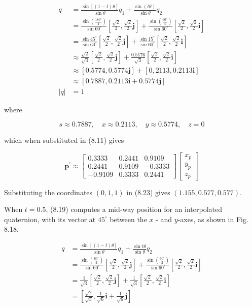 \documentclass[10pt]{article}
\begin{document}
$$
\begin{aligned}
q & =\frac{\sin [(1-t) \theta]}{\sin \theta} q_{1}+\frac{\sin (t \theta)}{\sin \theta} q_{2} \\
& =\frac{\sin \left(\frac{180^{\circ}}{4}\right)}{\sin 60^{\circ}}\left[\frac{\sqrt{2}}{2}, \frac{\sqrt{2}}{2} \mathbf{j}\right]+\frac{\sin \left(\frac{60^{\circ}}{4}\right)}{\sin 60^{\circ}}\left[\frac{\sqrt{2}}{2}, \frac{\sqrt{2}}{2} \mathbf{i}\right] \\
& =\frac{\sin 45^{\circ}}{\sin 60^{\circ}}\left[\frac{\sqrt{2}}{2}, \frac{\sqrt{2}}{2} \mathbf{j}\right]+\frac{\sin 15^{\circ}}{\sin 60^{\circ}}\left[\frac{\sqrt{2}}{2}, \frac{\sqrt{2}}{2} \mathbf{i}\right] \\
& \approx \frac{\sqrt{2}}{\sqrt{3}}\left[\frac{\sqrt{2}}{2}, \frac{\sqrt{2}}{2} \mathbf{j}\right]+\frac{0.5176}{\sqrt{3}}\left[\frac{\sqrt{2}}{2}, \frac{\sqrt{2}}{2} \mathbf{i}\right] \\
& \approx[0.5774,0.5774 \mathbf{j}]+[0,2113,0.2113 \mathbf{i}] \\
& \approx[0.7887,0.2113 \mathbf{i}+0.5774 \mathbf{j}] \\
|q| & =1
\end{aligned}
$$

where

$$
s \approx 0.7887, \quad x \approx 0.2113, \quad y \approx 0.5774, \quad z=0
$$

which when substituted in (8.11) gives

$$
\mathbf{p}^{\prime} \approx\left[\begin{array}{ccc}
0.3333 & 0.2441 & 0.9109 \\
0.2441 & 0.9109 & -0.3333 \\
-0.9109 & 0.3333 & 0.2441
\end{array}\right]\left[\begin{array}{c}
x_{p} \\
y_{p} \\
z_{p}
\end{array}\right]
$$

Substituting the coordinates $(0,1,1)$ in (8.23) gives $(1.155,0.577,0.577)$.

When $t=0.5$, (8.19) computes a mid-way position for an interpolated quaternion, with its vector at $45^{\circ}$ between the $x$ - and $y$-axes, as shown in Fig. 8.18.

$$
\begin{aligned}
q & =\frac{\sin [(1-t) \theta]}{\sin \theta} q_{1}+\frac{\sin t \theta}{\sin \theta} q_{2} \\
& =\frac{\sin \left(\frac{60^{\circ}}{2}\right)}{\sin 60^{\circ}}\left[\frac{\sqrt{2}}{2}, \frac{\sqrt{2}}{2} \mathbf{j}\right]+\frac{\sin \left(\frac{60^{\circ}}{2}\right)}{\sin 60^{\circ}}\left[\frac{\sqrt{2}}{2}, \frac{\sqrt{2}}{2} \mathbf{i}\right] \\
& =\frac{1}{\sqrt{3}}\left[\frac{\sqrt{2}}{2}, \frac{\sqrt{2}}{2} \mathbf{j}\right]+\frac{1}{\sqrt{3}}\left[\frac{\sqrt{2}}{2}, \frac{\sqrt{2}}{2} \mathbf{i}\right] \\
& =\left[\frac{\sqrt{2}}{\sqrt{3}}, \frac{1}{\sqrt{6}} \mathbf{i}+\frac{1}{\sqrt{6}} \mathbf{j}\right]
\end{aligned}
$$
\end{document}
